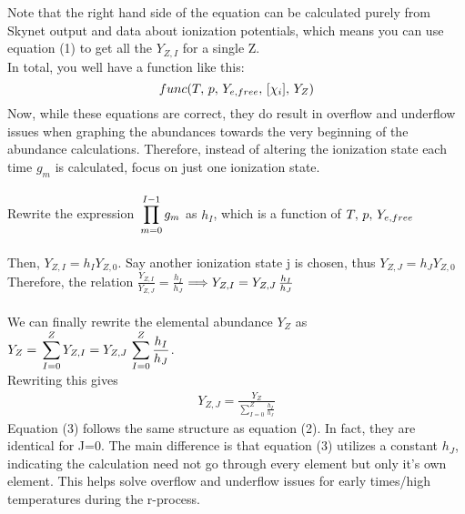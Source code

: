 \documentclass[11pt,a4paper]{article}
\begin{document}
Note that the right hand side of the equation can be calculated purely from Skynet output and data about ionization potentials, which means you can use equation (1) to get all the $Y_{Z,I}$ for a single Z. 
\\
In total, you well have a function like this: $$func(T,\thinspace p,\thinspace Y_{e,free},\thinspace [\chi_i],\thinspace Y_Z)$$
Now, while these equations are correct, they do result in overflow and underflow issues when graphing the abundances towards the very beginning of the abundance calculations. Therefore, instead of altering the ionization state each time $g_m$ is calculated, focus on just one ionization state. 
\\\\
Rewrite the expression  $\thinspace \displaystyle \prod_{m=0}^{I - 1} g_m$ as $h_I$, which is a function of $T,\thinspace p,\thinspace Y_{e,free}$ \\\\
Then, $Y_{Z,I} = h_I  Y_{Z,0}$. Say another ionization state j is chosen, thus $Y_{Z,J} = h_J  Y_{Z,0}$ \\Therefore, the relation $\frac{Y_{Z,I}}{Y_{Z,J}} = \frac{h_I}{h_J} $ $\Longrightarrow
Y_{Z,I} = Y_{Z,J}\thinspace \frac{h_I}{h_J}$ \\\\
We can finally rewrite the elemental abundance $Y_Z$ as $Y_Z =\thinspace \displaystyle \sum_{I=0}^{Z} Y_{Z,I} = Y_{Z,J}\thinspace \displaystyle \sum_{I=0}^{Z} \frac{h_I}{h_J} $.\\ Rewriting this gives 
\begin{align}
Y_{Z,J} = \frac{Y_Z}{\displaystyle \sum_{I=0}^{Z} \frac{h_I}{h_J}}
\end{align} 
Equation (3) follows the same structure as equation (2). In fact, they are identical for J=0. The main difference is that equation (3) utilizes a constant $h_J$, indicating the calculation need not go through every element but only it's own element. This helps solve overflow and underflow issues for early times/high temperatures during the r-process. 
\end{document}
